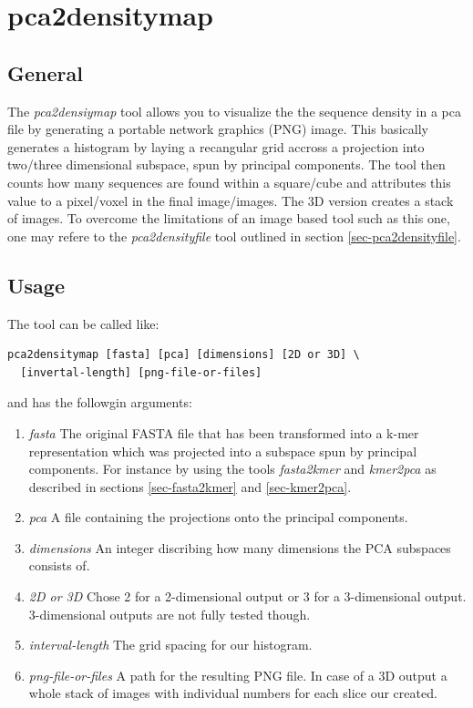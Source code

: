 \section{pca2densitymap} \label{sec-pca2densitymap}

\subsection{General}

The \emph{pca2densiymap} tool allows you to visualize the the sequence density
in a pca file by generating a portable network graphics (PNG)
image. This basically 
generates a histogram by laying a recangular grid accross a projection
into two/three dimensional subspace, spun by principal components. The
tool then counts how many sequences are found within a square/cube
and attributes this value to a pixel/voxel in the final
image/images. The 3D version creates a stack of images. To overcome
the limitations of an image based tool such as this one,
one may refere to the \emph{pca2densityfile} tool outlined in section
\ref{sec-pca2densityfile}. 

\subsection{Usage}

The tool can be called like:
\begin{lstlisting}
pca2densitymap [fasta] [pca] [dimensions] [2D or 3D] \
  [invertal-length] [png-file-or-files]
\end{lstlisting}
and has the followgin arguments:
\begin{enumerate}
  \item \emph{fasta} The original FASTA file that has been transformed
    into a k-mer representation which was projected into a subspace
    spun by principal components. For instance by using the tools
    \emph{fasta2kmer} and \emph{kmer2pca} as described in sections
    \ref{sec-fasta2kmer} and \ref{sec-kmer2pca}.
  \item \emph{pca} A file containing the projections onto the
    principal components.
  \item \emph{dimensions} An integer discribing how many dimensions
    the PCA subspaces consists of.
  \item \emph{2D or 3D} Chose 2 for a 2-dimensional output or 3 for a
    3-dimensional output. 3-dimensional outputs are not fully tested
    though.
  \item \emph{interval-length} The grid spacing for our histogram.
  \item \emph{png-file-or-files} A path for the resulting PNG file. In
    case of a 3D output a whole stack of images with individual
    numbers for each slice our created.  
\end{enumerate}

